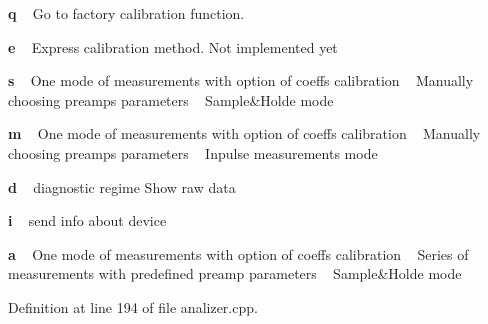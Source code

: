 \begin{DoxyItemize}
\item {\bfseries q} ~\newline
Go to factory calibration function.
\item {\bfseries e} ~\newline
Express calibration method. Not implemented yet
\item {\bfseries s} ~\newline
One mode of measurements with option of coeffs calibration ~\newline
Manually choosing preamps parameters ~\newline
Sample\&Holde mode
\item {\bfseries m} ~\newline
One mode of measurements with option of coeffs calibration ~\newline
Manually choosing preamps parameters ~\newline
Inpulse measurements mode
\item {\bfseries d} ~\newline
diagnostic regime Show raw data
\item {\bfseries i} ~\newline
send info about device
\item {\bfseries a} ~\newline
One mode of measurements with option of coeffs calibration ~\newline
Series of measurements with predefined preamp parameters ~\newline
Sample\&Holde mode 
\end{DoxyItemize}

Definition at line 194 of file analizer.\+cpp.

